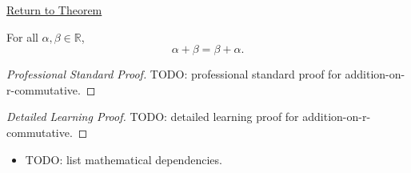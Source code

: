 \newpage
{}
\label{prf:addition-on-r-commutative}

\begin{remark*}[Return]
\hyperref[thm:addition-on-r-commutative]{Return to Theorem}
\end{remark*}

\begin{theorem*}
For all $\alpha,\beta\in\mathbb{R}$,
\[
\alpha+\beta=\beta+\alpha.
\]
\end{theorem*}

\begin{proof}[Professional Standard Proof]
\LRAProofBodyStart
TODO: professional standard proof for addition-on-r-commutative.
\end{proof}

\begin{proof}[Detailed Learning Proof]
\LRAProofBodyStart
TODO: detailed learning proof for addition-on-r-commutative.
\end{proof}

\begin{remark*}
\end{remark*}

\begin{dependencies}
\begin{itemize}
  \item TODO: list mathematical dependencies.
\end{itemize}
\end{dependencies}

\clearpage

